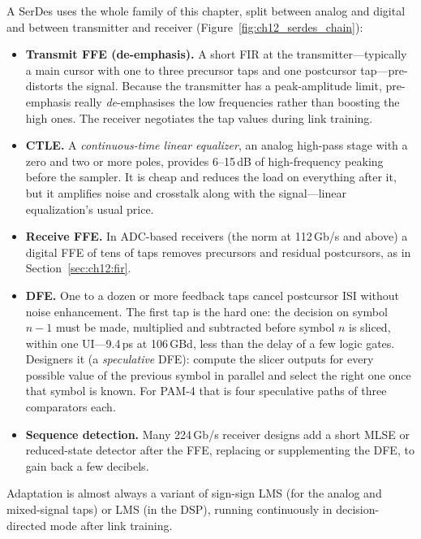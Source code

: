 A SerDes uses the whole family of this chapter, split between analog and digital and between
transmitter and receiver (Figure~\ref{fig:ch12_serdes_chain}):
\begin{itemize}
\item \textbf{Transmit FFE (de-emphasis).} A short FIR at the transmitter---typically a main
cursor with one to three precursor taps and one postcursor tap---pre-distorts the signal. Because the
transmitter has a peak-amplitude limit, pre-emphasis really \emph{de}-emphasises the low frequencies
rather than boosting the high ones. The receiver negotiates the tap values during link training.
\item \textbf{CTLE.} A \emph{continuous-time linear equalizer}, an analog high-pass stage with a
zero and two or more poles, provides 6--15\,dB of high-frequency peaking before the sampler. It is
cheap and reduces the load on everything after it, but it amplifies noise and crosstalk along with the
signal---linear equalization's usual price.
\item \textbf{Receive FFE.} In ADC-based receivers (the norm at 112\,Gb/s and above) a digital FFE of
tens of taps removes precursors and residual postcursors, as in Section~\ref{sec:ch12:fir}.
\item \textbf{DFE.} One to a dozen or more feedback taps cancel postcursor ISI without noise
enhancement. The first tap is the hard one: the decision on symbol $n-1$ must be made, multiplied and
subtracted before symbol $n$ is sliced, within one UI---9.4\,ps at 106\,GBd, less than the delay of a
few logic gates. Designers  it (a \emph{speculative} DFE): compute the slicer
outputs for every possible value of the previous symbol in parallel and select the right one once that
symbol is known. For PAM-4 that is four speculative paths of three comparators each.
\item \textbf{Sequence detection.} Many 224\,Gb/s receiver designs add a short MLSE or reduced-state
detector after the FFE, replacing or supplementing the DFE, to gain back a few decibels.
\end{itemize}
Adaptation is almost always a variant of sign-sign LMS (for the analog and mixed-signal taps) or LMS
(in the DSP), running continuously in decision-directed mode after link training.


